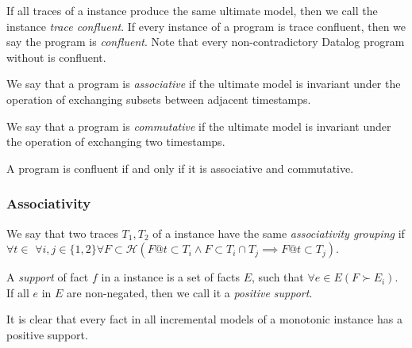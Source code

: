 If all traces of a \lang instance produce the same ultimate model, then we
call the instance {\em trace confluent}.  If every instance of a program is
trace confluent, then we say the program is {\em confluent}.  Note that every
non-contradictory Datalog program without  is confluent.

\begin{definition}
%
We say that a \lang program is {\em associative} if the
ultimate model is invariant under the operation of exchanging subsets between
adjacent timestamps.
%
\end{definition}

\begin{definition}
%
We say that a \lang program is {\em commutative} if the ultimate model is
invariant under the operation of exchanging two timestamps.
%
\end{definition}

\begin{lemma}
%
A \lang program is confluent if and only if it is associative and commutative.
%
\end{lemma}

\subsubsection{Associativity}

\begin{definition}
%
We say that two traces $T_1, T_2$ of a \lang instance have the same {\em
associativity grouping} if $\forall t \in$  $\forall i,j \in
\{1,2\} \forall F \subset \mathcal{H} (F@t \subset T_i \land F \subset T_i \cap
T_j \implies F@t \subset T_j)$.
%
\end{definition}

\begin{definition}
%
A {\em support} of fact $f$ in a \lang instance is a set of facts $E$, such
that $\forall e \in E (F \succ E_i)$.  If all $e$ in $E$ are non-negated, then
we call it a {\em positive support}.
%
\end{definition}

It is clear that every fact in all incremental models of a monotonic \lang
instance has a positive support.

